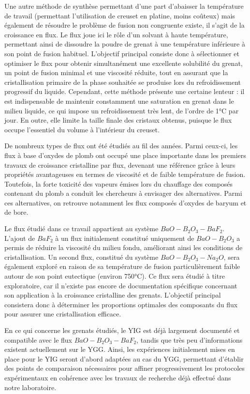 \documentclass{rapportENSCP}
\begin{document}
Une autre méthode de synthèse permettant d'une part d'abaisser la température de travail (permettant l'utilisation de creuset en platine, moins coûteux) mais également de résoudre le problème de fusion non congruente existe, il s'agit de la croissance en flux. Le flux joue ici le rôle d'un solvant à haute température, permettant ainsi de dissoudre la poudre de grenat à une température inférieure à son point de fusion habituel. L'objectif principal consiste donc à sélectionner et optimiser le flux pour obtenir simultanément une excellente solubilité du grenat, un point de fusion minimal et une viscosité réduite, tout en assurant que la cristallisation primaire de la phase souhaitée se produise lors du refroidissement progressif du liquide. Cependant, cette méthode présente une certaine lenteur : il est indispensable de maintenir constamment une saturation en grenat dans le milieu liquide, ce qui impose un refroidissement très lent, de l'ordre de 1°C par jour. En outre, elle limite la taille finale des cristaux obtenus, puisque le flux occupe l'essentiel du volume à l'intérieur du creuset.

De nombreux types de flux ont été étudiés au fil des années. Parmi ceux-ci, les flux à base d’oxydes de plomb ont occupé une place importante dans les premiers travaux de croissance cristalline par flux, devenant une référence grâce à leurs propriétés avantageuses en termes de viscosité et de faible température de fusion. Toutefois, la forte toxicité des vapeurs émises lors du chauffage des composés contenant du plomb a conduit les chercheurs à envisager des alternatives. Parmi ces alternatives, on retrouve notamment les flux composés d’oxydes de baryum et de bore.

Le flux étudié dans ce travail appartient au système $BaO-B_2O_3-BaF_2$. L’ajout de $BaF_2$ à un flux initialement constitué uniquement de $BaO-B_2O_3$ a permis de réduire la viscosité du milieu fondu, améliorant ainsi les conditions de cristallisation. Un second flux, constitué du système $BaO-B_2O_3-Na_2O$, sera également exploré en raison de sa température de fusion particulièrement faible autour de son point eutectique (environ 750°C). Ce flux sera étudié à titre exploratoire, car il n’existe pas encore de documentation spécifique concernant son application à la croissance cristalline des grenats. L’objectif principal consistera donc à déterminer les proportions optimales des composants du flux pour assurer une cristallisation efficace.

En ce qui concerne les grenats étudiés, le YIG est déjà largement documenté et compatible avec le flux $BaO-B_2O_3-BaF_2$, tandis que très peu d’informations existent actuellement sur le YGG. Ainsi, les expériences initialement mises en place pour le YIG seront d’abord adaptées au cas du YGG, permettant d’établir des points de comparaison nécessaires pour affiner progressivement les protocoles expérimentaux en cohérence avec les travaux de recherche déjà effectué dans notre laboratoire.
\end{document}
